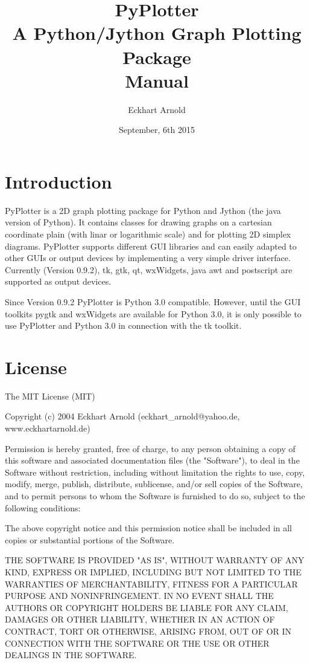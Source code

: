 \documentclass[12pt,a4paper,USenglish]{article}
\begin{document}
\title{PyPlotter\\A Python/Jython Graph Plotting Package\\Manual}
\author{Eckhart Arnold}
\date{September, 6th 2015}

\maketitle

\tableofcontents{}


\section{Introduction}

{\sf PyPlotter} is a 2D graph plotting package for Python and Jython
(the java version of Python). It contains classes for drawing graphs
on a cartesian coordinate plain (with linar or logarithmic scale) and
for plotting 2D simplex diagrams. {\sf PyPlotter} supports different
GUI libraries and can easily adapted to other GUIs or output devices
by implementing a very simple driver interface. Currently (Version
0.9.2), tk, gtk, qt, wxWidgets, java awt and postscript are supported as
output devices.

Since Version 0.9.2 PyPlotter is Python 3.0 compatible. However, until 
the GUI toolkits pygtk and wxWidgets are available for Python 3.0, it is
only possible to use PyPlotter and Python 3.0 in connection with the tk 
toolkit.

\section{License }

The MIT License (MIT)

Copyright (c) 2004 Eckhart Arnold (eckhart\_arnold@yahoo.de, www.eckhartarnold.de)

Permission is hereby granted, free of charge, to any person obtaining a copy
of this software and associated documentation files (the "Software"), to deal
in the Software without restriction, including without limitation the rights
to use, copy, modify, merge, publish, distribute, sublicense, and/or sell
copies of the Software, and to permit persons to whom the Software is
furnished to do so, subject to the following conditions:

The above copyright notice and this permission notice shall be included in
all copies or substantial portions of the Software.

THE SOFTWARE IS PROVIDED "AS IS", WITHOUT WARRANTY OF ANY KIND, EXPRESS OR
IMPLIED, INCLUDING BUT NOT LIMITED TO THE WARRANTIES OF MERCHANTABILITY,
FITNESS FOR A PARTICULAR PURPOSE AND NONINFRINGEMENT. IN NO EVENT SHALL THE
AUTHORS OR COPYRIGHT HOLDERS BE LIABLE FOR ANY CLAIM, DAMAGES OR OTHER
LIABILITY, WHETHER IN AN ACTION OF CONTRACT, TORT OR OTHERWISE, ARISING FROM,
OUT OF OR IN CONNECTION WITH THE SOFTWARE OR THE USE OR OTHER DEALINGS IN
THE SOFTWARE.
\end{document}
